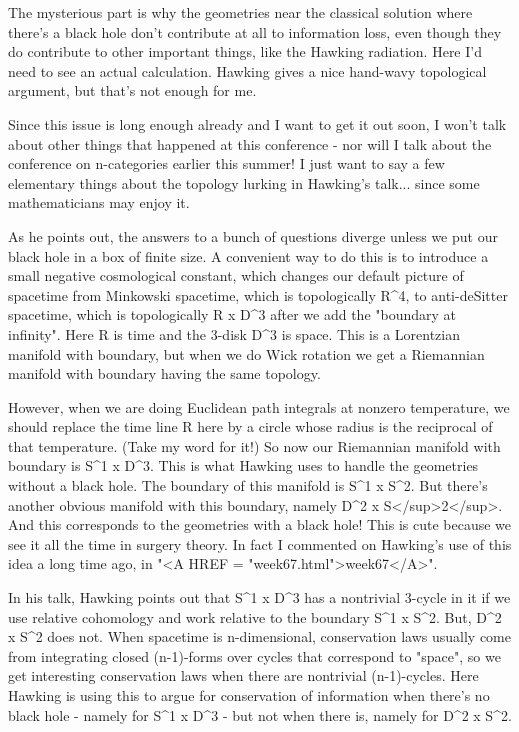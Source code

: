 The mysterious part is why the geometries near the classical solution 
where there's a black hole don't contribute at all to information loss, 
even though they do contribute to other important things, like the
Hawking radiation.  Here I'd need to see an actual calculation.  Hawking
gives a nice hand-wavy topological argument, but that's not enough for
me.   

Since this issue is long enough already and I want to get it out soon,
I won't talk about other things that happened at this conference - nor
will I talk about the conference on n-categories earlier this summer!
I just want to say a few elementary things about the topology lurking 
in Hawking's talk... since some mathematicians may enjoy it. 

As he points out, the answers to a bunch of questions diverge unless 
we put our black hole in a box of finite size.  A convenient way
to do this is to introduce a small negative cosmological constant,
which changes our default picture of spacetime from Minkowski spacetime,
which is topologically R^{4}, to anti-deSitter spacetime, which is 
topologically R x D^{3} after we add the "boundary at infinity".  
Here R is time and the 3-disk D^{3} is space.  This is a Lorentzian 
manifold with boundary, but when we do Wick rotation we get a Riemannian
manifold with boundary having the same topology.  

However, when we are doing Euclidean path integrals at nonzero 
temperature, we should replace the time line R here by a circle 
whose radius is the reciprocal of that temperature.  (Take my word 
for it!)  So now our Riemannian manifold with boundary is S^{1} x 
D^{3}.  
This is what Hawking uses to handle the geometries without a black
hole.  The boundary of this manifold is S^{1} x S^{2}.  
But there's 
another obvious manifold with this boundary, namely D^{2} x 
S</sup>2</sup>.  And 
this corresponds to the geometries with a black hole!   This is cute
because we see it all the time in surgery theory.  In fact I commented
on Hawking's use of this idea a long time ago, in 
"<A HREF = "week67.html">week67</A>".

In his talk, Hawking points out that S^{1} x D^{3} 
has a nontrivial 3-cycle 
in it if we use relative cohomology and work relative to the boundary
S^{1} x S^{2}.  But, D^{2} x S^{2} 
does not.  When spacetime is n-dimensional, 
conservation laws usually come from integrating closed (n-1)-forms over 
cycles that correspond to "space", 
so we get interesting conservation laws 
when there are nontrivial (n-1)-cycles.  Here Hawking is using this to
argue for conservation of information when there's no black hole - namely
for S^{1} x D^{3} - but not when there is, namely for 
D^{2} x S^{2}.  

